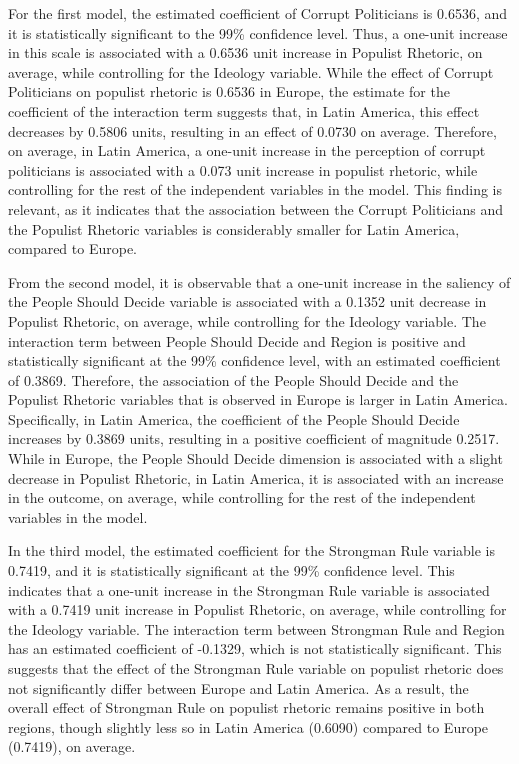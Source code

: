 \documentclass[12pt,letterpaper]{article}
\begin{document}
For the first model, the estimated coefficient of Corrupt Politicians is 0.6536, and it is statistically significant to the 99\% confidence level. Thus, a one-unit increase in this scale is associated with a 0.6536 unit increase in Populist Rhetoric, on average, while controlling for the Ideology variable. While the effect of Corrupt Politicians on populist rhetoric is 0.6536 in Europe, the estimate for the coefficient of the interaction term suggests that, in Latin America, this effect decreases by 0.5806 units, resulting in an effect of 0.0730 on average. Therefore, on average, in Latin America, a one-unit increase in the perception of corrupt politicians is associated with a 0.073 unit increase in populist rhetoric, while controlling for the rest of the independent variables in the model. This finding is relevant, as it indicates that the association between the Corrupt Politicians and the Populist Rhetoric variables is considerably smaller for Latin America, compared to Europe.

From the second model, it is observable that a one-unit increase in the saliency of the People Should Decide variable is associated with a 0.1352 unit decrease in Populist Rhetoric, on average, while controlling for the Ideology variable. The interaction term between People Should Decide and Region is positive and statistically significant at the 99\% confidence level, with an estimated coefficient of 0.3869. Therefore, the association of the People Should Decide and the Populist Rhetoric variables that is observed in Europe is larger in Latin America. Specifically, in Latin America, the coefficient of the People Should Decide increases by 0.3869 units, resulting in a positive coefficient of magnitude 0.2517. While in Europe, the People Should Decide dimension is associated with a slight decrease in Populist Rhetoric, in Latin America, it is associated with an increase in the outcome, on average, while controlling for the rest of the independent variables in the model.

In the third model, the estimated coefficient for the Strongman Rule variable is 0.7419, and it is statistically significant at the 99\% confidence level. This indicates that a one-unit increase in the Strongman Rule variable is associated with a 0.7419 unit increase in Populist Rhetoric, on average, while controlling for the Ideology variable. The interaction term between Strongman Rule and Region has an estimated coefficient of -0.1329, which is not statistically significant. This suggests that the effect of the Strongman Rule variable on populist rhetoric does not significantly differ between Europe and Latin America. As a result, the overall effect of Strongman Rule on populist rhetoric remains positive in both regions, though slightly less so in Latin America (0.6090) compared to Europe (0.7419), on average.
\end{document}
